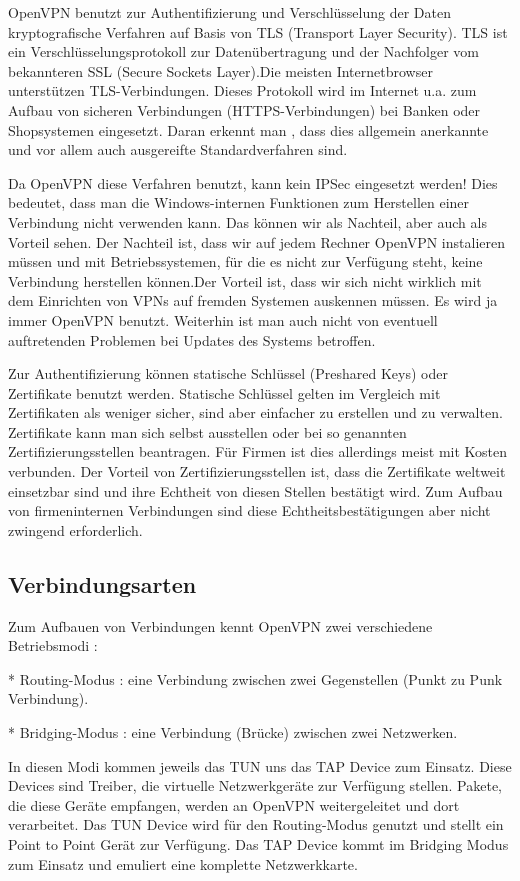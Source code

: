 \documentclass[12pt]{scrartcl}
\begin{document}
OpenVPN benutzt zur Authentifizierung und Verschlüsselung der Daten kryptografische Verfahren auf Basis von TLS (Transport Layer Security). TLS ist ein Verschlüsselungsprotokoll zur Datenübertragung und der Nachfolger vom bekannteren SSL (Secure Sockets Layer).Die meisten Internetbrowser unterstützen TLS-Verbindungen. Dieses Protokoll wird im Internet u.a. zum Aufbau von sicheren Verbindungen  (HTTPS-Verbindungen) bei Banken oder Shopsystemen  eingesetzt. Daran erkennt man , dass dies allgemein anerkannte und vor allem auch ausgereifte  Standardverfahren sind.

Da OpenVPN diese Verfahren benutzt, kann kein IPSec eingesetzt werden! Dies bedeutet, dass man die Windows-internen Funktionen zum Herstellen einer Verbindung nicht verwenden kann. Das können wir als Nachteil, aber auch als Vorteil sehen. Der Nachteil ist, dass wir auf jedem Rechner OpenVPN instalieren müssen und mit Betriebssystemen, für die es nicht zur Verfügung steht, keine Verbindung herstellen können.Der Vorteil ist, dass wir sich nicht wirklich mit dem Einrichten von VPNs auf fremden Systemen auskennen müssen. Es wird ja immer OpenVPN benutzt. Weiterhin ist man auch nicht von eventuell auftretenden Problemen bei Updates des Systems betroffen.

Zur Authentifizierung können statische Schlüssel (Preshared Keys) oder Zertifikate benutzt werden. Statische Schlüssel gelten im Vergleich mit Zertifikaten  als weniger sicher, sind aber einfacher zu erstellen und zu verwalten. Zertifikate kann man sich selbst ausstellen oder bei so genannten Zertifizierungsstellen beantragen. Für Firmen ist dies allerdings meist mit Kosten verbunden. Der Vorteil von Zertifizierungsstellen ist, dass die Zertifikate weltweit einsetzbar sind und ihre Echtheit von diesen Stellen bestätigt wird. Zum Aufbau von firmeninternen Verbindungen sind diese Echtheitsbestätigungen aber nicht zwingend erforderlich.

\subsection{Verbindungsarten}

Zum Aufbauen von Verbindungen kennt OpenVPN zwei verschiedene Betriebsmodi :

* Routing-Modus : eine Verbindung zwischen zwei Gegenstellen (Punkt zu Punk Verbindung).

* Bridging-Modus : eine Verbindung (Brücke) zwischen zwei Netzwerken.

In diesen Modi kommen jeweils das TUN uns das TAP Device zum Einsatz. Diese Devices sind Treiber, die virtuelle Netzwerkgeräte zur Verfügung stellen. Pakete, die diese Geräte empfangen, werden an OpenVPN weitergeleitet und dort verarbeitet. Das TUN Device wird für den Routing-Modus genutzt und stellt ein Point to Point Gerät zur Verfügung. Das TAP Device kommt im Bridging Modus zum Einsatz und emuliert eine komplette Netzwerkkarte. 
\end{document}
